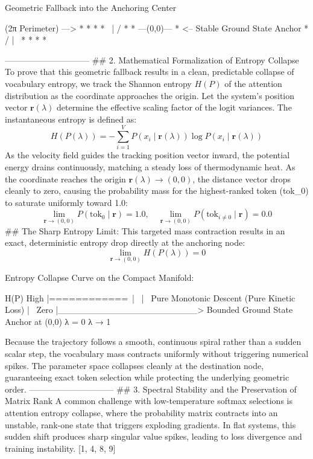                     Geometric Fallback into the Anchoring Center
                    
                     (2π Perimeter) --->  *   *   *
                                       *   \ | /   *
                                      *  ---(0,0)--- *  <-- Stable Ground State Anchor
                                       *   / | \   *
                                         *   *   *

------------------------------
## 2. Mathematical Formalization of Entropy Collapse
To prove that this geometric fallback results in a clean, predictable collapse of vocabulary entropy, we track the Shannon entropy $H(P)$ of the attention distribution as the coordinate approaches the origin. Let the system's position vector $\mathbf{r}(\lambda)$ determine the effective scaling factor of the logit variances. The instantaneous entropy is defined as:
$$H(P(\lambda)) = -\sum_{i=1}^{V} P(x_i \mid \mathbf{r}(\lambda)) \log P(x_i \mid \mathbf{r}(\lambda))$$ 
As the velocity field guides the tracking position vector inward, the potential energy drains continuously, matching a steady loss of thermodynamic heat. As the coordinate reaches the origin $\mathbf{r}(\lambda) \to (0,0)$, the distance vector drops cleanly to zero, causing the probability mass for the highest-ranked token (tok_0) to saturate uniformly toward 1.0:
$$\lim_{\mathbf{r} \to (0,0)} P(\text{tok}_0 \mid \mathbf{r}) = 1.0, \quad \lim_{\mathbf{r} \to (0,0)} P(\text{tok}_{i \neq 0} \mid \mathbf{r}) = 0.0$$ 
## The Sharp Entropy Limit:
This targeted mass contraction results in an exact, deterministic entropy drop directly at the anchoring node:
$$\lim_{\mathbf{r} \to (0,0)} H(P(\lambda)) = 0$$ 

Entropy Collapse Curve on the Compact Manifold:

H(P) High |============\
          |             \
          |              \  Pure Monotonic Descent (Pure Kinetic Loss)
          |               \
     Zero |________________\______> Bounded Ground State Anchor at (0,0)
          λ = 0             λ → 1

Because the trajectory follows a smooth, continuous spiral rather than a sudden scalar step, the vocabulary mass contracts uniformly without triggering numerical spikes. The parameter space collapses cleanly at the destination node, guaranteeing exact token selection while protecting the underlying geometric order.
------------------------------
## 3. Spectral Stability and the Preservation of Matrix Rank
A common challenge with low-temperature softmax selections is attention entropy collapse, where the probability matrix contracts into an unstable, rank-one state that triggers exploding gradients. In flat systems, this sudden shift produces sharp singular value spikes, leading to loss divergence and training instability. [1, 4, 8, 9] 

